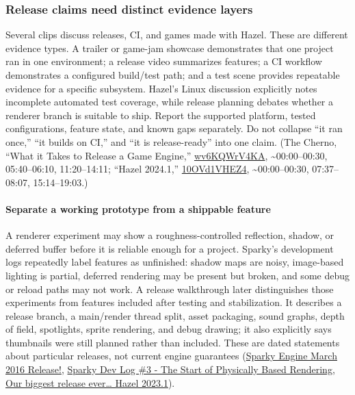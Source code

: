 \subsubsection{Release claims need distinct evidence layers}\label{release-claims-need-distinct-evidence-layers}

Several clips discuss releases, CI, and games made with Hazel. These are different evidence types. A trailer or game-jam showcase demonstrates that one project ran in one environment; a release video summarizes features; a CI workflow demonstrates a configured build/test path; and a test scene provides repeatable evidence for a specific subsystem. Hazel's Linux discussion explicitly notes incomplete automated test coverage, while release planning debates whether a renderer branch is suitable to ship. Report the supported platform, tested configurations, feature state, and known gaps separately. Do not collapse ``it ran once,'' ``it builds on CI,'' and ``it is release-ready'' into one claim. (The Cherno, ``What it Takes to Release a Game Engine,'' \href{https://www.youtube.com/watch?v=wv6KQWrV4KA}{wv6KQWrV4KA}, \textasciitilde00:00--00:30, 05:40--06:10, 11:20--14:11; ``Hazel 2024.1,'' \href{https://www.youtube.com/watch?v=10OVd1VHEZ4}{10OVd1VHEZ4}, \textasciitilde00:00--00:30, 07:37--08:07, 15:14--19:03.)

\paragraph{Separate a working prototype from a shippable feature}\label{separate-a-working-prototype-from-a-shippable-feature}

A renderer experiment may show a roughness-controlled reflection, shadow, or deferred buffer before it is reliable enough for a project. Sparky's development logs repeatedly label features as unfinished: shadow maps are noisy, image-based lighting is partial, deferred rendering may be present but broken, and some debug or reload paths may not work. A release walkthrough later distinguishes those experiments from features included after testing and stabilization. It describes a release branch, a main/render thread split, asset packaging, sound graphs, depth of field, spotlights, sprite rendering, and debug drawing; it also explicitly says thumbnails were still planned rather than included. These are dated statements about particular releases, not current engine guarantees (\href{https://www.youtube.com/watch?v=o4_tPhgslcU&t=4m34s}{Sparky Engine March 2016 Release!}, \href{https://www.youtube.com/watch?v=YRd2F1JDGlg&t=0m8s}{Sparky Dev Log \#3 - The Start of Physically Based Rendering}, \href{https://www.youtube.com/watch?v=L_XLGmG2Ct8&t=0m1s}{Our biggest release ever\ldots{} Hazel 2023.1}).

